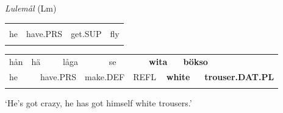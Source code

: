 \begin{listWWNumileveli}
\item {}

\begin{styleExample}
\textit{Lulemål} (Lm)

\end{styleExample}

\end{listWWNumileveli}

\begin{listWWNumxliileveli}
\item {}

\end{listWWNumxliileveli}

\begin{tabular}{llll}
\lsptoprule
\multicolumn{4}{l}{Hån

}\\
he & have.PRS & get.SUP & fly\\
\lspbottomrule
\end{tabular}

\begin{tabular}{llllllllllll}
\lsptoprule
hån & \multicolumn{2}{l}{hä

} & \multicolumn{2}{l}{låga

} & \multicolumn{2}{l}{se

} & \multicolumn{2}{l}{{\bfseries wita}

} & \multicolumn{2}{l}{{\bfseries bökso}

} & \\
\multicolumn{2}{l}{he

} & \multicolumn{2}{l}{have.PRS

} & \multicolumn{2}{l}{make.DEF

} & \multicolumn{2}{l}{REFL

} & \multicolumn{2}{l}{{\bfseries white}

} & \multicolumn{2}{l}{{\bfseries trouser.DAT.PL}

}\\
\lspbottomrule
\end{tabular}

\begin{styleTranslation}
‘He’s got crazy, he has got himself white trousers.’

\end{styleTranslation}


